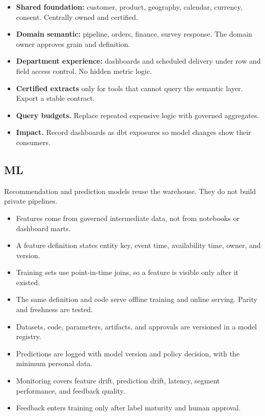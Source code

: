 \documentclass[10pt,a4paper]{article}
\begin{document}
\begin{itemize}
  \item \textbf{Shared foundation:} customer, product, geography,
        calendar, currency, consent. Centrally owned and certified.
  \item \textbf{Domain semantic:} pipeline, orders, finance, survey
        response. The domain owner approves grain and definition.
  \item \textbf{Department experience:} dashboards and scheduled
        delivery under row and field access control. No hidden metric
        logic.
  \item \textbf{Certified extracts} only for tools that cannot query the
        semantic layer. Export a stable contract.
  \item \textbf{Query budgets.} Replace repeated expensive logic with
        governed aggregates.
  \item \textbf{Impact.} Record dashboards as dbt exposures so model
        changes show their consumers.\cite{dbtExposures}
\end{itemize}

\subsection{ML}

Recommendation and prediction models reuse the warehouse. They do not
build private pipelines.

\begin{itemize}
  \item Features come from governed intermediate data, not from
        notebooks or dashboard marts.
  \item A feature definition states entity key, event time, availability
        time, owner, and version.
  \item Training sets use point-in-time joins, so a feature is visible
        only after it existed.\cite{feast}
  \item The same definition and code serve offline training and online
        serving. Parity and freshness are tested.
  \item Datasets, code, parameters, artifacts, and approvals are
        versioned in a model registry.\cite{gcModelRegistry}
  \item Predictions are logged with model version and policy decision,
        with the minimum personal data.
  \item Monitoring covers feature drift, prediction drift, latency,
        segment performance, and feedback quality.\cite{gcModelMonitoring}
  \item Feedback enters training only after label maturity and human
        approval.
\end{itemize}
\end{document}
